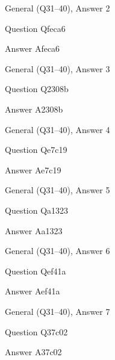 \documentclass[11pt]{beamer}
\begin{document}
\begin{frame}[t]{General (Q31--40), Answer 2}
\vspace{2em}
\begin{block}{Question}
Qfeca6
\end{block}
\pause{}
\begin{block}{Answer}
Afeca6
\end{block}
\end{frame}
    

\begin{frame}[t]{General (Q31--40), Answer 3}
\vspace{2em}
\begin{block}{Question}
Q2308b
\end{block}
\pause{}
\begin{block}{Answer}
A2308b
\end{block}
\end{frame}
    

\begin{frame}[t]{General (Q31--40), Answer 4}
\vspace{2em}
\begin{block}{Question}
Qe7c19
\end{block}
\pause{}
\begin{block}{Answer}
Ae7c19
\end{block}
\end{frame}
    

\begin{frame}[t]{General (Q31--40), Answer 5}
\vspace{2em}
\begin{block}{Question}
Qa1323
\end{block}
\pause{}
\begin{block}{Answer}
Aa1323
\end{block}
\end{frame}
    

\begin{frame}[t]{General (Q31--40), Answer 6}
\vspace{2em}
\begin{block}{Question}
Qef41a
\end{block}
\pause{}
\begin{block}{Answer}
Aef41a
\end{block}
\end{frame}
    

\begin{frame}[t]{General (Q31--40), Answer 7}
\vspace{2em}
\begin{block}{Question}
Q37c02
\end{block}
\pause{}
\begin{block}{Answer}
A37c02
\end{block}
\end{frame}
    
\end{document}

